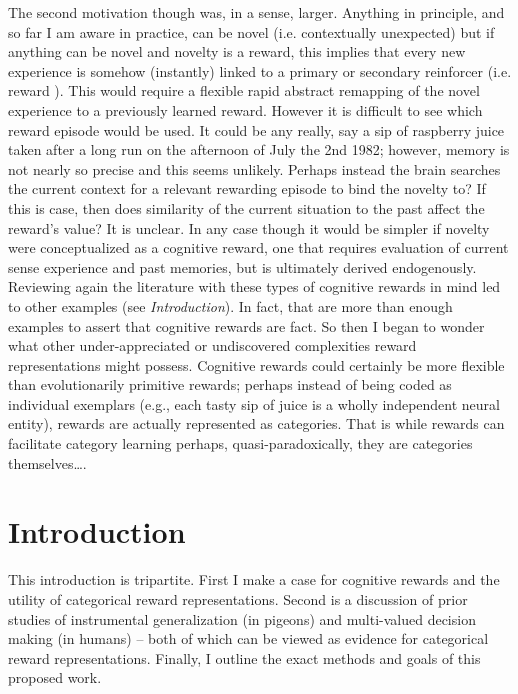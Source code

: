 \documentclass[doc,12pt]{apa}        %
\begin{document}
The second motivation though was, in a sense, larger.  Anything in principle, and so far I am aware in practice, can be novel (i.e. contextually unexpected) but if anything can be novel and novelty is a reward, this implies that every new experience is somehow (instantly) linked to a primary or secondary reinforcer (i.e. reward ).  This would require a flexible rapid abstract remapping of the novel experience to a previously learned reward.  However it is difficult to see which reward episode would be used.  It could be any really, say a sip of raspberry juice taken after a long run on the afternoon of July the 2nd 1982; however, memory is not nearly so precise and this seems unlikely.  Perhaps instead the brain searches the current context for a relevant rewarding episode to bind the novelty to?  If this is case, then does similarity of the current situation to the past affect the reward's value?  It is unclear.  In any case though it would be simpler if novelty were conceptualized as a cognitive reward, one that requires evaluation of current sense experience and past memories, but is ultimately derived endogenously.  Reviewing again the literature with these types of cognitive rewards in mind led to other examples (see \emph{Introduction}).  In fact, that are more than enough examples to assert that cognitive rewards are fact.  So then I began to wonder what other under-appreciated or undiscovered complexities reward representations might possess.  Cognitive rewards could certainly be more flexible than evolutionarily primitive rewards; perhaps instead of being coded as individual exemplars (e.g., each tasty sip of juice is a wholly independent neural entity), rewards are actually represented as categories.  That is while rewards can facilitate category learning perhaps, quasi-paradoxically, they are categories themselves\ldots.

\section{Introduction} %
\label{sec:introduction}
This introduction is tripartite.  First I make a case for cognitive rewards and the utility of categorical reward representations.  Second is a discussion of prior studies of instrumental generalization (in pigeons) and multi-valued decision making (in humans) -- both of which can be viewed as evidence for categorical reward representations.  Finally, I outline the exact methods and goals of this proposed work.
\end{document}
